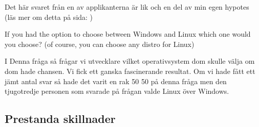 \documentclass[12pt, a4paper]{report}
\begin{document}
Det här svaret från en av applikanterna är lik och en del av min egen hypotes (läs mer om detta på sida: \pageref{slutsats})


   \vspace{3cm}
 
   \large{If you had the option to choose between Windows and Linux which one would you choose? (of course, you can choose any distro for Linux)}
  
   \vspace{.5cm}
  
   \normalsize I Denna fråga så frågar vi utvecklare vilket operativsystem dom skulle välja om dom hade chansen. Vi fick ett ganska fascinerande resultat. Om vi hade fått ett jämt antal svar så hade det varit en rak 50 50 på denna fråga men den tjugotredje personen som svarade på frågan valde Linux över Windows.
 
   \vspace{1cm}
 
 
   \cite{form}
 
   \vspace{1cm}

   \subsection{Prestanda skillnader}
\end{document}

